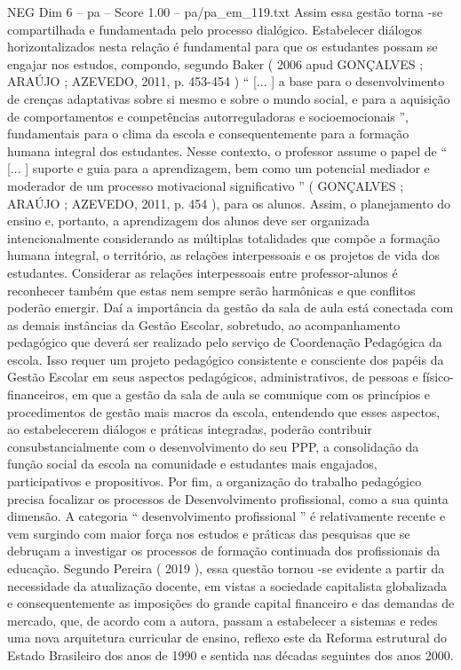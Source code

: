 \begin{textsample}{NEG Dim 6 – pa – Score 1.00 – pa/pa\_em\_119.txt}
Assim essa gestão torna -se compartilhada e fundamentada pelo processo dialógico.
Estabelecer diálogos horizontalizados nesta relação é fundamental para que os estudantes possam se engajar nos estudos, compondo, segundo Baker ( 2006 apud GONÇALVES ; ARAÚJO ; AZEVEDO, 2011, p. 453-454 ) “ [... ] a base para o desenvolvimento de crenças adaptativas sobre si mesmo e sobre o mundo social, e para a aquisição de comportamentos e competências autorreguladoras e socioemocionais ”, fundamentais para o clima da escola e consequentemente para a formação humana integral dos estudantes.
Nesse contexto, o professor assume o papel de “ [... ] suporte e guia para a aprendizagem, bem como um potencial mediador e moderador de um processo motivacional significativo ” ( GONÇALVES ; ARAÚJO ; AZEVEDO, 2011, p. 454 ), para os alunos.
Assim, o planejamento do ensino e, portanto, a aprendizagem dos alunos deve ser organizada intencionalmente considerando as múltiplas totalidades que compõe a formação humana integral, o território, as relações interpessoais e os projetos de vida dos estudantes.
Considerar as relações interpessoais entre professor-alunos é reconhecer também que estas nem sempre serão harmônicas e que conflitos poderão emergir.
Daí a importância da gestão da sala de aula está conectada com as demais instâncias da Gestão Escolar, sobretudo, ao acompanhamento pedagógico que deverá ser realizado pelo serviço de Coordenação Pedagógica da escola.
Isso requer um projeto pedagógico consistente e consciente dos papéis da Gestão Escolar em seus aspectos pedagógicos, administrativos, de pessoas e físico-financeiros, em que a gestão da sala de aula se comunique com os princípios e procedimentos de gestão mais macros da escola, entendendo que esses aspectos, ao estabelecerem diálogos e práticas integradas, poderão contribuir consubstancialmente com o desenvolvimento do seu PPP, a consolidação da função social da escola na comunidade e estudantes mais engajados, participativos e propositivos.
Por fim, a organização do trabalho pedagógico precisa focalizar os processos de Desenvolvimento profissional, como a sua quinta dimensão.
A categoria “ desenvolvimento profissional ” é relativamente recente e vem surgindo com maior força nos estudos e práticas das pesquisas que se debruçam a investigar os processos de formação continuada dos profissionais da educação.
Segundo Pereira ( 2019 ), essa questão tornou -se evidente a partir da necessidade da atualização docente, em vistas a sociedade capitalista globalizada e consequentemente as imposições do grande capital financeiro e das demandas de mercado, que, de acordo com a autora, passam a estabelecer a sistemas e redes uma nova arquitetura curricular de ensino, reflexo este da Reforma estrutural do Estado Brasileiro dos anos de 1990 e sentida nas décadas seguintes dos anos 2000.

\end{textsample}

